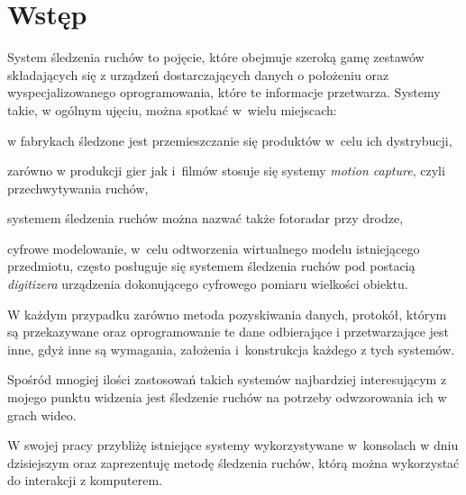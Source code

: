 \chapter{Wstęp}\label{ch:introduction}

System śledzenia ruchów to pojęcie, które obejmuje szeroką gamę zestawów składających się z urządzeń dostarczających danych o położeniu oraz wyspecjalizowanego oprogramowania, które te informacje przetwarza.
Systemy takie, w ogólnym ujęciu, można spotkać w~wielu miejscach:
\begin{aenumerate}
  \item w fabrykach śledzone jest przemieszczanie się produktów w~celu ich dystrybucji,
  \item zarówno w produkcji gier jak i~filmów stosuje się systemy \textsl{motion capture}, czyli przechwytywania ruchów,
  \item systemem śledzenia ruchów można nazwać także fotoradar przy drodze,
  \item cyfrowe modelowanie, w~celu odtworzenia wirtualnego modelu istniejącego przedmiotu, często posługuje się systemem śledzenia ruchów pod postacią \textit{digitizera} \ppauza{} urządzenia dokonującego cyfrowego pomiaru wielkości obiektu.
\end{aenumerate}

W każdym przypadku zarówno metoda pozyskiwania danych, protokół, którym są przekazywane oraz oprogramowanie te dane odbierające i przetwarzające jest inne, gdyż inne są wymagania, założenia i~konstrukcja każdego z tych systemów.

Spośród mnogiej ilości zastosowań takich systemów najbardziej interesującym z mojego punktu widzenia jest śledzenie ruchów na potrzeby odwzorowania ich w grach wideo.

W swojej pracy przybliżę istniejące systemy wykorzystywane w~konsolach w dniu dzisiejszym oraz zaprezentuję metodę śledzenia ruchów, którą można wykorzystać do interakcji z komputerem.
